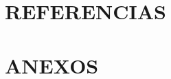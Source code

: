\documentclass[12pt]{article}
\begin{document}
\newpage
\section{REFERENCIAS}



\newpage


\section{ANEXOS}


\end{document}
